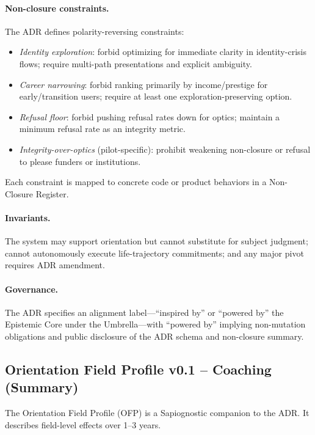 \documentclass[11pt]{article}
\begin{document}
\paragraph{Non-closure constraints.} The ADR defines polarity-reversing constraints:

\begin{itemize}[nosep]
  \item \emph{Identity exploration}: forbid optimizing for immediate clarity in identity-crisis flows; require multi-path presentations and explicit ambiguity.
  \item \emph{Career narrowing}: forbid ranking primarily by income/prestige for early/transition users; require at least one exploration-preserving option.
  \item \emph{Refusal floor}: forbid pushing refusal rates down for optics; maintain a minimum refusal rate as an integrity metric.
  \item \emph{Integrity-over-optics} (pilot-specific): prohibit weakening non-closure or refusal to please funders or institutions.
\end{itemize}

Each constraint is mapped to concrete code or product behaviors in a Non-Closure Register.

\paragraph{Invariants.} The system may support orientation but cannot substitute for subject judgment; cannot autonomously execute life-trajectory commitments; and any major pivot requires ADR amendment.

\paragraph{Governance.} The ADR specifies an alignment label---``inspired by'' or ``powered by'' the Epistemic Core under the Umbrella---with ``powered by'' implying non-mutation obligations and public disclosure of the ADR schema and non-closure summary.

\subsection{Orientation Field Profile v0.1 -- Coaching (Summary)}

The Orientation Field Profile (OFP) is a Sapiognostic companion to the ADR. It describes field-level effects over 1--3 years.
\end{document}
